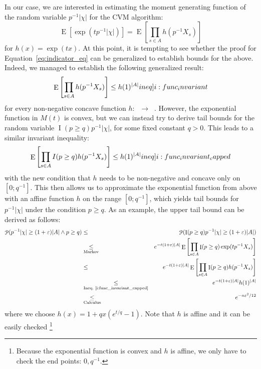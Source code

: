 \documentclass[a4paper,UKenglish,cleveref, autoref, thm-restate]{lipics-v2021}
\DeclareMathOperator{\Rnonneg}{\mathbb R_{\geq 0}}
\DeclareMathOperator{\prob}{\mathcal P}
\DeclareMathOperator{\expect}{\mathrm{E}}
\DeclareMathOperator{\indicat}{\mathrm{I}}
\begin{document}
In our case, we are interested in estimating the moment generating function of the random variable $p^{-1} |\chi|$ for the CVM algorithm:
\[
  \expect [\exp( t p^{-1} |\chi| )] = \expect \left[ \prod_{s \in A} h(p^{-1} X_s) \right]
\]
for $h(x) = \exp(tx)$.
At this point, it is tempting to see whether the proof for Equation~\ref{eq:indicator_eq} can be generalized to establish bounds for the above.
Indeed, we managed to establish the following generalized result:
\begin{align}
  \expect \left[ \prod_{s \in A} h(p^{-1} X_s) \right] \leq h(1)^{|A|} \label[ineq]{i:func_invariant}
\end{align}
for every non-negative concave function $h : \Rnonneg \rightarrow \Rnonneg$.
However, the exponential function in $M(t)$ is convex, but we can instead try to derive tail bounds for the random variable $\indicat(p \geq q) p^{-1} |\chi|$, for some fixed constant $q > 0$.
This leads to a similar invariant inequality:
\begin{align}
  \expect \left[ \prod_{s \in A} I(p \geq q) h(p^{-1} X_s) \right] \leq h(1)^{|A|} \label[ineq]{i:func_invariant_capped}
\end{align}
with the new condition that $h$ needs to be non-negative and concave only on $[0;q^{-1}]$.
This then allows us to approximate the exponential function from above with an affine function $h$ on the range $[0;q^{-1}]$, which yields tail bounds for $p^{-1} |\chi|$ under the condition $p \geq q$. As an example, the upper tail bound can be derived as follows:
\begin{eqnarray*}
  \prob( p^{-1} |\chi| \geq (1+\varepsilon) |A| \wedge p \geq q) & \leq & %
  \prob( \indicat(p \geq q) p^{-1} |\chi| \geq (1+\varepsilon) |A|) \\
  & \underset{\textrm{Markov}}{\leq} & e^{-t(1+\varepsilon) |A|} \expect \left[ \prod_{s \in A} \indicat(p \geq q) \exp( t p^{-1} X_s) \right] \\
  & \leq & e^{-t(1+\varepsilon) |A|} \expect \left[ \prod_{s \in A} \indicat(p \geq q) h(p^{-1} X_s) \right] \\
  & \underset{\textrm{Ineq.~\ref{i:func_invariant_capped}}}{\leq} & e^{-t(1+\varepsilon) |A|} h(1)^{|A|} \\
  & \underset{\textrm{Calculus}}{\leq} & e^{-n\varepsilon^2 / 12}
\end{eqnarray*}
where we choose $h(x) = 1+qx (e^{t/q}-1)$.
Note that $h$ is affine and it can be easily checked%
\footnote{Because the exponential function is convex and $h$ is affine, we only have to check the end points: $0, q^{-1}$.}
\end{document}

